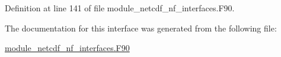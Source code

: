 Definition at line 141 of file module\+\_\+netcdf\+\_\+nf\+\_\+interfaces.\+F90.



The documentation for this interface was generated from the following file\+:\begin{DoxyCompactItemize}
\item 
\hyperlink{module__netcdf__nf__interfaces_8F90}{module\+\_\+netcdf\+\_\+nf\+\_\+interfaces.\+F90}\end{DoxyCompactItemize}
